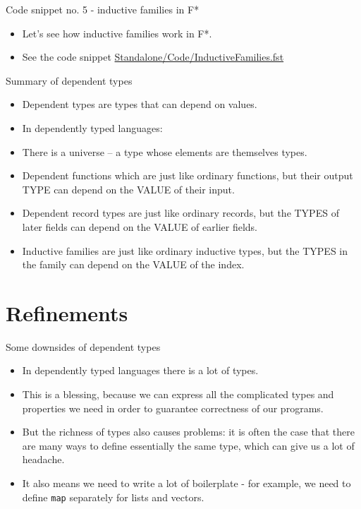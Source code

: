 \documentclass{beamer}
\newcommand{\m}[1]{\texttt{#1}}
\begin{document}
\begin{frame}{Code snippet no. 5 - inductive families in F*}
\begin{itemize}
	\item Let's see how inductive families work in F*.
	\item See the code snippet \href{https://github.com/wkolowski/Dependent-Types-and-Theorem-Proving/blob/master/Standalone/Code/InductiveFamilies.fst}{Standalone/Code/InductiveFamilies.fst}
\end{itemize}
\end{frame}

\begin{frame}{Summary of dependent types}
\begin{itemize}
	\item Dependent types are types that can depend on values.
	\item In dependently typed languages:
	\item There is a universe -- a type whose elements are themselves types.
	\item Dependent functions which are just like ordinary functions, but their output TYPE can depend on the VALUE of their input.
	\item Dependent record types are just like ordinary records, but the TYPES of later fields can depend on the VALUE of earlier fields.
	\item Inductive families are just like ordinary inductive types, but the TYPES in the family can depend on the VALUE of the index.
\end{itemize}
\end{frame}

\section{Refinements}

\begin{frame}{Some downsides of dependent types}
\begin{itemize}
    \item In dependently typed languages there is a lot of types.
    \item This is a blessing, because we can express all the complicated types and properties we need in order to guarantee correctness of our programs.
    \item But the richness of types also causes problems: it is often the case that there are many ways to define essentially the same type, which can give us a lot of headache.
    \item It also means we need to write a lot of boilerplate - for example, we need to define \m{map} separately for lists and vectors.
\end{itemize}
\end{frame}
\end{document}
